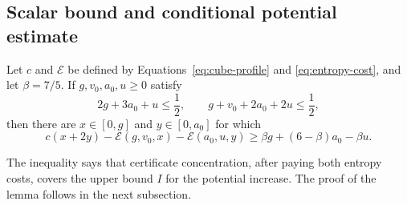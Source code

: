 \subsection{Scalar bound and conditional potential estimate}

\begin{lemma}\label{lem:budget-optimization}
Let \(c\) and \(\mathcal E\) be defined by
Equations~\eqref{eq:cube-profile} and \eqref{eq:entropy-cost}, and let
\(\beta=7/5\). If \(g,v_0,a_0,u\ge0\) satisfy
\[
 2g+3a_0+u\le\frac12,\qquad
 g+v_0+2a_0+2u\le\frac12,
\]
then there are \(x\in[0,g]\) and \(y\in[0,a_0]\) for which
\begin{equation}\label{eq:budget-primal}
 c(x+2y)-\mathcal E(g,v_0,x)-\mathcal E(a_0,u,y)
 \ge \beta g+(6-\beta)a_0-\beta u.
\end{equation}
\end{lemma}

The inequality says that certificate concentration, after paying both
entropy costs, covers the upper bound \(I\) for the potential increase.
The proof of the lemma follows in the next subsection.

